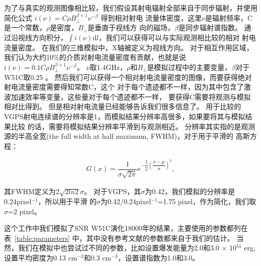 为了与真实的观测图像相比较，我们假设其射电辐射全部来自于同步辐射，并使用简化公式
$i(\nu)=C\rho B_{\perp}^{\beta + 1}\nu^{-\beta}$ \citep{Orlando2007}得到相对射电
流量体密度，这里$\nu$是辐射频率，C是一个常数，$\rho$是密度，$B_{\perp}$是垂直于视线方
向的磁场，$\beta$是同步辐射谱指数。
通过沿视线方向积分，$\int i(\nu) \mathrm{d}l$，我们可以获得可以与实际观测相比较的相对
射电流量密度。
在我们的三维模拟中，X轴被定义为视线方向。
对于相互作用区域，我们认为大约10$\%$的介质对射电流量密度有贡献，也就是说
$i(\nu)=0.1C\rho B_{\perp}^{\beta + 1}\nu^{-\beta}$。
$\nu$取1.4GHz，$\rho$和$B_{\perp}$是模拟过程中的主要变量，$\beta$对于W51C取0.25
\citep{1970AuJPA..14..133S}。
然后我们可以获得一个相对射电流量密度的图像，而要获得绝对射电流量密度需要得知常数C，这个
对于每个遗迹都不一样，因为其中包含了激波加速效率等变量，这些量对于每个遗迹都不一样，
要获得C需要将观测与模拟相对比得到。
但是相对射电流量已经能够告诉我们很多信息了。
用于比较的VGPS射电连续谱的分辨率是1\am，而模拟结果分辨率高很多，如果要将其与模拟结果比较
的话，需要将模拟结果分辨率平滑到与观测相近。
分辨率其实指的是观测源的半高全宽(the full width at half maximum, FWHM)，对于用于平滑的
高斯方程：

\begin{equation}
  \begin{aligned}
    G(x)=\dfrac{1}{\sigma \sqrt{2\pi}}e^{-\dfrac{1}{2}(\dfrac{x-\mu}{\sigma})^2},
  \end{aligned}
\end{equation}

其FWHM定义为$2\sqrt{2ln2} \sigma$。
对于VGPS，其$\sigma$为0.42\am，我们模拟的分辨率是0.24\am pixel$^{-1}$，所以用于平滑
的$\sigma$为0.42\am/0.24\am pixel$^{-1}$=1.75 pixel，作为简化，我们取$\sigma$=2
pixel。

这个工作中我们模拟了SNR W51C演化18000年的结果，主要使用的参数都列在表~\ref{table:parameters}
中，其中没有参考文献的参数都来自于我们的估计。
当然，我们在模拟中也尝试过不同的参数，比如设置爆发能量为2.0和3.0 $\times$ 10$^{51}$ erg,
设置平均密度为0.13 cm$^{-3}$和0.3 cm$^{-3}$，设置谱指数为1.0和3.0。

